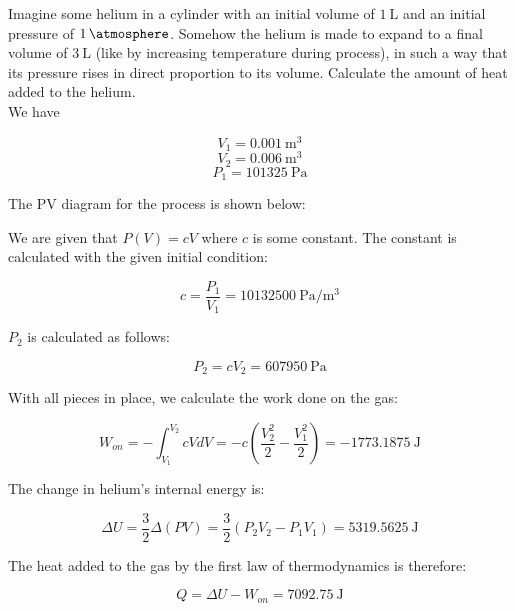 \begin{texample}
	Imagine some helium in a cylinder with an initial volume of $\SI{1}{\liter}$ and an initial pressure of $\SI{1}{\atmosphere}$. Somehow the helium is made to expand to a final volume of $\SI{3}{\liter}$ (like by increasing temperature during process), in such a way that its pressure rises in direct proportion to its volume. Calculate the amount of heat added to the helium. \\
	
	We have
	
	\[V_1=\SI{0.001}{\cubic\meter}\]
	\[V_2=\SI{0.006}{\cubic\meter}\]
	\[P_1=\SI{101325}{\pascal}\]
	
	The PV diagram for the process is shown below:
	
	\begin{figure}[H]
		\centering
	\end{figure}
	
	We are given that $P(V)=cV$ where $c$ is some constant. The constant is calculated with the given initial condition:
	
	\[c=\frac{P_1}{V_1}=\SI{10132500}{\pascal\per\cubic\meter}\]
	
	$P_2$ is calculated as follows:
	
	\[P_2=cV_2=\SI{607950}{\pascal}\]
	
	With all pieces in place, we calculate the work done on the gas:
	
	\[W_{on}=-\int_{V_1}^{V_2} cVdV=-c\left( \frac{V_2^2}{2} - \frac{V_1^2}{2} \right)=\SI{-1773.1875}{\joule}\]
	
	The change in helium's internal energy is:
	
	\[\Delta U=\frac{3}{2}\Delta(PV)=\frac{3}{2}(P_2V_2-P_1V_1)=\SI{5319.5625}{\joule}\]
	
	The heat added to the gas by the first law of thermodynamics is therefore:
	
	\[Q=\Delta U-W_{on}=\SI{7092.75}{\joule}\]
	
\end{texample}

